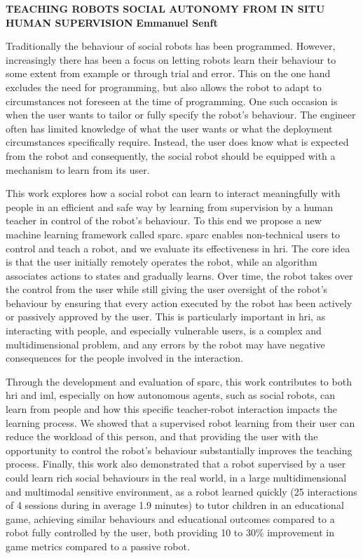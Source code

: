 \textbf{TEACHING ROBOTS SOCIAL AUTONOMY FROM IN SITU HUMAN SUPERVISION}\newline
\textbf{Emmanuel Senft}

Traditionally the behaviour of social robots has been programmed. However, increasingly there has been a focus on letting robots learn their behaviour to some extent from example or through trial and error. This on the one hand excludes the need for programming, but also allows the robot to adapt to circumstances not foreseen at the time of programming. One such occasion is when the user wants to tailor or fully specify the robot’s behaviour. The engineer often has limited knowledge of what the user wants or what the deployment circumstances specifically require. Instead, the user does know what is expected from the robot and consequently, the social robot should be equipped with a mechanism to learn from its user.

This work explores how a social robot can learn to interact meaningfully with people in an efficient and safe way by learning from supervision by a human teacher in control of the robot's behaviour. To this end we propose a new machine learning framework called \gls{sparc}. \gls{sparc} enables non-technical users to control and teach a robot, and we evaluate its effectiveness in \gls{hri}. The core idea is that the user initially remotely operates the robot, while an algorithm associates actions to states and gradually learns. Over time, the robot takes over the control from the user while still giving the user oversight of the robot’s behaviour by ensuring that every action executed by the robot has been actively or passively approved by the user. This is particularly important in \gls{hri}, as interacting with people, and especially vulnerable users, is a complex and multidimensional problem, and any errors by the robot may have negative consequences for the people involved in the interaction. 

Through the development and evaluation of \gls{sparc}, this work contributes to both \gls{hri} and \acrlong{iml}, especially on how autonomous agents, such as social robots, can learn from people and how this specific teacher-robot interaction impacts the learning process. We showed that a supervised robot learning from their user can reduce the workload of this person, and that providing the user with the opportunity to control the robot's behaviour substantially improves the teaching process. Finally, this work also demonstrated that a robot supervised by a user could learn rich social behaviours in the real world, in a large multidimensional and multimodal sensitive environment, as a robot learned quickly (25 interactions of 4 sessions during in average 1.9 minutes) to tutor children in an educational game, achieving similar behaviours and educational outcomes compared to a robot fully controlled by the user, both providing 10 to 30\% improvement in game metrics compared to a passive robot. 